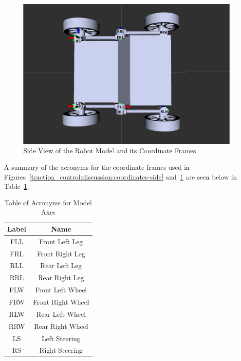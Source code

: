 \begin{figure}[H]
	\centering
	\includegraphics[scale=0.3]{sections/discussion/images/srr_top.png}
	\caption{Side View of the Robot Model and its Coordinate Frames}
	\label{traction_control:discussion:coordinates-top}
\end{figure}
 
A summary of the acronyms for the coordinate frames used in Figures~\ref{traction_control:discussion:coordinates-side} and~\ref{traction_control:discussion:coordinates-top} are seen below in Table~\ref{table:1}.
\begin{table}[H]
\begin{center}
	\begin{tabular}{|c|c|} 
		\hline    
		Label & Name \\
		\hline
		FLL & Front Left Leg \\
		FRL & Front Right Leg \\
		RLL & Rear Left Leg \\
		RRL & Rear Right Leg \\
		FLW & Front Left Wheel \\
		FRW & Front Right Wheel \\
		RLW & Rear Left Wheel \\
		RRW & Rear Right Wheel \\
		LS  & Left Steering \\ 
		RS  & Right Steering \\ 
	    \hline
	\end{tabular}
 	\caption{\label{table:1} Table of Acronyms for Model Axes}  	
\end{center}
\end{table}

